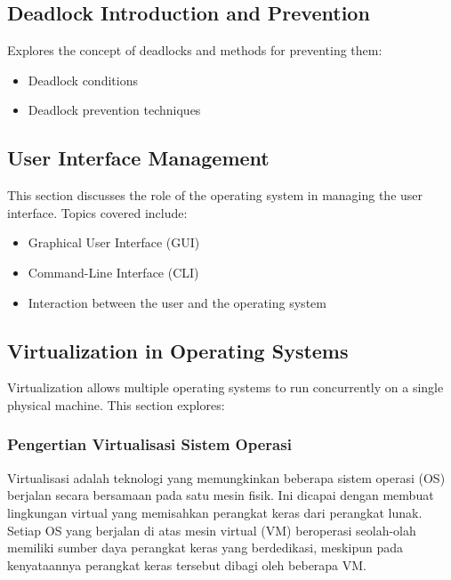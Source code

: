 \documentclass[12pt]{article}
\begin{document}
\subsection{Deadlock Introduction and Prevention}
Explores the concept of deadlocks and methods for preventing them:
\begin{itemize}
    \item Deadlock conditions
    \item Deadlock prevention techniques
\end{itemize}

\subsection{User Interface Management}
This section discusses the role of the operating system in managing the user interface. Topics covered include:
\begin{itemize}
    \item Graphical User Interface (GUI)
    \item Command-Line Interface (CLI)
    \item Interaction between the user and the operating system
\end{itemize}

\subsection{Virtualization in Operating Systems}
Virtualization allows multiple operating systems to run concurrently on a single physical machine. This section explores:
\subsubsection{Pengertian Virtualisasi Sistem Operasi}
    \par Virtualisasi adalah teknologi yang memungkinkan beberapa sistem operasi (OS) berjalan secara bersamaan pada satu mesin fisik. Ini dicapai dengan membuat lingkungan virtual yang memisahkan perangkat keras dari perangkat lunak. Setiap OS yang berjalan di atas mesin virtual (VM) beroperasi seolah-olah memiliki sumber daya perangkat keras yang berdedikasi, meskipun pada kenyataannya perangkat keras tersebut dibagi oleh beberapa VM.
\end{document}

